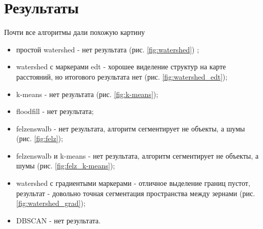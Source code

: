 \documentclass[a4paper, 14pt]{article}
\begin{document}
	\section{Результаты}
	
		Почти все алгоритмы дали похожую картину
	
	\begin{itemize}
		
		\item простой watershed - нет результата (рис. \ref {fig:watershed}) ;
		
		\item watershed с маркерами edt - хорошее виделение структур на карте расстояний,
		но итогового результата нет (рис. \ref {fig:watershed_edt});
		
		\item k-means -  нет результата (рис. \ref {fig:k-means});
		
		\item floodfill - нет результата;
		
		\item felzenswalb - нет результата, алгоритм сегментирует не объекты, а шумы (рис. \ref {fig:felz});  
		
		\item felzenswalb и k-means - нет результата,
		алгоритм сегментирует не объекты, а шумы  (рис. \ref{fig:felz_k-means});  
		
		\item watershed с градиентыми маркерами - отличное выделение границ пустот, 
		результат - довольно точная сегментация пространства между зернами (рис. \ref {fig:watershed_grad});
		
		\item DBSCAN - нет результата.
		
		
		
		
	\end{itemize}
	
\end{document}
